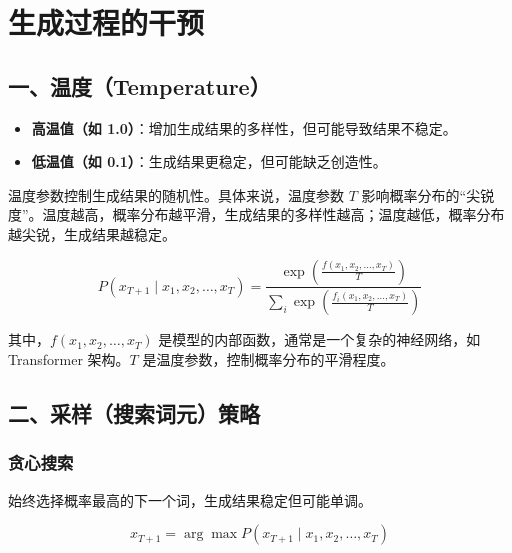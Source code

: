 \setcounter{section}{2}

\hypertarget{ux751fux6210ux8fc7ux7a0bux7684ux5e72ux9884}{%
\section{生成过程的干预}\label{ux751fux6210ux8fc7ux7a0bux7684ux5e72ux9884}}

\hypertarget{ux4e00ux6e29ux5ea6temperature}{%
\subsection{一、温度（Temperature）}\label{ux4e00ux6e29ux5ea6temperature}}

\begin{itemize}
\tightlist
\item
  \textbf{高温值（如 1.0）}：增加生成结果的多样性，但可能导致结果不稳定。
\item
  \textbf{低温值（如 0.1）}：生成结果更稳定，但可能缺乏创造性。
\end{itemize}

温度参数控制生成结果的随机性。具体来说，温度参数 \(T\) 影响概率分布的``尖锐度''。温度越高，概率分布越平滑，生成结果的多样性越高；温度越低，概率分布越尖锐，生成结果越稳定。

\[
P(x_{T+1} \mid x_1, x_2, \ldots, x_T) =
\frac{\exp\left(\frac{f(x_1,x_2,\ldots,x_T)}{T}\right)}
{\sum_i \exp\left(\frac{f_i(x_1,x_2,\ldots,x_T)}{T}\right)}
\]

其中，\(f(x_1,x_2,\ldots,x_T)\) 是模型的内部函数，通常是一个复杂的神经网络，如 Transformer 架构。\(T\) 是温度参数，控制概率分布的平滑程度。

\hypertarget{ux4e8cux91c7ux6837ux641cux7d22ux8bcdux5143ux7b56ux7565}{%
\subsection{二、采样（搜索词元）策略}\label{ux4e8cux91c7ux6837ux641cux7d22ux8bcdux5143ux7b56ux7565}}

\hypertarget{ux8d2aux5fc3ux641cux7d22}{%
\subsubsection{贪心搜索}\label{ux8d2aux5fc3ux641cux7d22}}

始终选择概率最高的下一个词，生成结果稳定但可能单调。

\[
x_{T+1} = \arg\max P(x_{T+1} \mid x_1, x_2, \ldots, x_T)
\]

